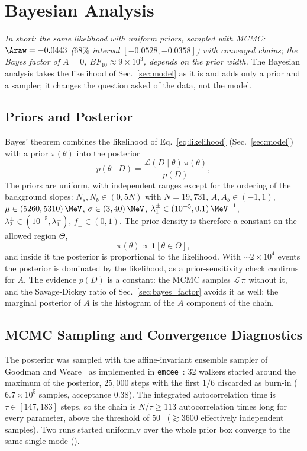 \section{Bayesian Analysis}
\label{sec:bayesian}
\emph{In short: the same likelihood with uniform priors, sampled with MCMC: $\Araw=-0.0443$ ($68\%$ interval $[-0.0528,-0.0358]$) with converged chains; the Bayes factor of $A=0$, $BF_{10}\approx9\times10^3$, depends on the prior width.}
The Bayesian analysis takes the likelihood of Sec.~\ref{sec:model} as it is and adds only a prior and a sampler; it changes the question asked of the data, not the model.
\subsection{Priors and Posterior}
\label{sec:bayes_prior}
Bayes' theorem combines the likelihood of Eq.~\eqref{eq:likelihood} (Sec.~\ref{sec:model}) with a prior $\pi(\theta)$ into the posterior
\begin{equation}
p(\theta\mid D)=\frac{\mathcal{L}(D\mid\theta)\,\pi(\theta)}{p(D)},
\label{eq:bayes}
\end{equation}
The priors are uniform, with independent ranges except for the ordering of the background slopes: $N_s,N_b\in(0,5N)$ with $N=19{,}731$, $A,A_b\in(-1,1)$, $\mu\in(5260,5310)\,\MeV$, $\sigma\in(3,40)\,\MeV$, $\lambda_1^{\pm}\in(10^{-5},0.1)\,\MeV^{-1}$, $\lambda_2^{\pm}\in(10^{-5},\lambda_1^{\pm})$, $f_{\pm}\in(0,1)$. The prior density is therefore a constant on the allowed region $\Theta$,
\begin{equation}
\pi(\theta)\propto\mathbf{1}\left[\theta\in\Theta\right],
\label{eq:prior}
\end{equation}
and inside it the posterior is proportional to the likelihood. With $\sim$$2\times10^4$ events the posterior is dominated by the likelihood, as a prior-sensitivity check confirms for $A$. The evidence $p(D)$ is a constant: the MCMC samples $\mathcal{L}\,\pi$ without it, and the Savage-Dickey ratio of Sec.~\ref{sec:bayes_factor} avoids it as well; the marginal posterior of $A$ is the histogram of the $A$ component of the chain.
\subsection{MCMC Sampling and Convergence Diagnostics}
\label{sec:bayes_mcmc}
The posterior was sampled with the affine-invariant ensemble sampler of Goodman and Weare~\cite{goodman_weare} as implemented in \texttt{emcee}~\cite{emcee}: 32 walkers started around the maximum of the posterior, $25{,}000$ steps with the first $1/6$ discarded as burn-in ($6.7\times10^5$ samples, acceptance $0.38$). The integrated autocorrelation time is $\tau\in[147,183]$ steps, so the chain is $N/\tau\geq113$ autocorrelation times long for every parameter, above the threshold of $50$~\cite{emcee} ($\gtrsim3600$ effectively independent samples). Two runs started uniformly over the whole prior box converge to the same single mode ().
